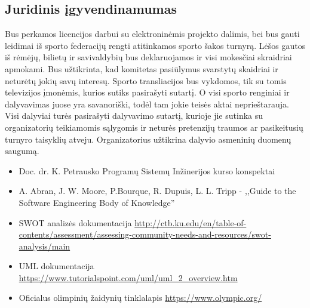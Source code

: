\documentclass{VUMIFPSkursinis}
\begin{document}
  \subsection{Juridinis įgyvendinamumas} \label{igyvendinamumoIrNaudosAnalize_juridinis}
	Bus perkamos licencijos darbui su elektroninėmis projekto dalimis, bei bus gauti leidimai iš sporto federacijų rengti atitinkamos sporto šakos turnyrą. Lėšos gautos iš rėmėjų, bilietų ir savivaldybių bus deklaruojamos ir visi mokesčiai skraidriai apmokami. Bus užtikrinta, kad komitetas pasiūlymus svarstytų skaidriai ir neturėtų jokių savų interesų. Sporto transliacijos bus vykdomos, tik su tomis televizijos įmonėmis, kurios sutiks pasirašyti sutartį. O visi sporto renginiai ir dalyvavimas juose yra savanoriški, todėl tam jokie teisės aktai neprieštarauja. Visi dalyviai turės pasirašyti dalyvavimo sutartį, kurioje jie sutinka su organizatorių teikiamomis sąlygomis ir neturės pretenzijų traumos ar pasikeitusių turnyro taisyklių atveju. Organizatorius užtikrina dalyvio asmeninių duomenų saugumą.
  \begin{itemize}
    \item Doc. dr. K. Petrausko Programų Sistemų Inžinerijos kurso konspektai
    \item A. Abran, J. W. Moore, P.Bourque, R. Dupuis, L. L. Tripp - ,,Guide to the Software Engineering Body of Knowledge''
    \item SWOT analizės dokumentacija \url{http://ctb.ku.edu/en/table-of-contents/assessment/assessing-community-needs-and-resources/swot-analysis/main}
    \item UML dokumentacija \url{https://www.tutorialspoint.com/uml/uml_2_overview.htm}
    \item Oficialus olimpinių žaidynių tinklalapis \url{https://www.olympic.org/}
  \end{itemize}
\end{document}
